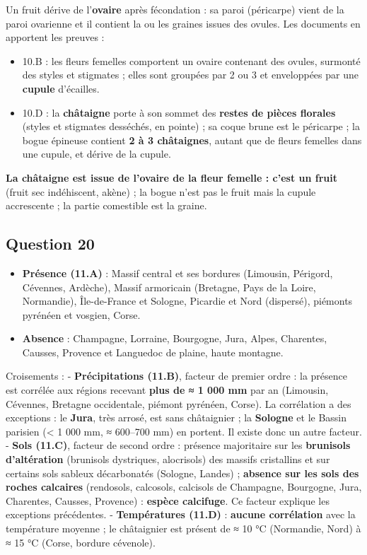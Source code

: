 \documentclass[11pt,a4paper]{article}
\providecommand{\tightlist}{\setlength{\itemsep}{0pt}\setlength{\parskip}{0pt}}
\begin{document}
Un fruit dérive de l'\textbf{ovaire} après fécondation : sa paroi (péricarpe) vient de la paroi ovarienne et il contient la ou les graines issues des ovules. Les documents en apportent les preuves :

\begin{itemize}
\tightlist
\item
  10.B : les fleurs femelles comportent un ovaire contenant des ovules, surmonté des styles et stigmates ; elles sont groupées par 2 ou 3 et enveloppées par une \textbf{cupule} d'écailles.
\item
  10.D : la \textbf{châtaigne} porte à son sommet des \textbf{restes de pièces florales} (styles et stigmates desséchés, en pointe) ; sa coque brune est le péricarpe ; la bogue épineuse contient \textbf{2 à 3 châtaignes}, autant que de fleurs femelles dans une cupule, et dérive de la cupule.
\end{itemize}

\textbf{La châtaigne est issue de l'ovaire de la fleur femelle : c'est un fruit} (fruit sec indéhiscent, akène) ; la bogue n'est pas le fruit mais la cupule accrescente ; la partie comestible est la graine.

\hypertarget{question-20}{%
\subsection{Question 20}\label{question-20}}

\begin{itemize}
\tightlist
\item
  \textbf{Présence (11.A)} : Massif central et ses bordures (Limousin, Périgord, Cévennes, Ardèche), Massif armoricain (Bretagne, Pays de la Loire, Normandie), Île-de-France et Sologne, Picardie et Nord (dispersé), piémonts pyrénéen et vosgien, Corse.
\item
  \textbf{Absence} : Champagne, Lorraine, Bourgogne, Jura, Alpes, Charentes, Causses, Provence et Languedoc de plaine, haute montagne.
\end{itemize}

Croisements :
- \textbf{Précipitations (11.B)}, facteur de premier ordre : la présence est corrélée aux régions recevant \textbf{plus de ≈ 1 000 mm} par an (Limousin, Cévennes, Bretagne occidentale, piémont pyrénéen, Corse). La corrélation a des exceptions : le \textbf{Jura}, très arrosé, est sans châtaignier ; la \textbf{Sologne} et le Bassin parisien (\textless{} 1 000 mm, ≈ 600--700 mm) en portent. Il existe donc un autre facteur.
- \textbf{Sols (11.C)}, facteur de second ordre : présence majoritaire sur les \textbf{brunisols d'altération} (brunisols dystriques, alocrisols) des massifs cristallins et sur certains sols sableux décarbonatés (Sologne, Landes) ; \textbf{absence sur les sols des roches calcaires} (rendosols, calcosols, calcisols de Champagne, Bourgogne, Jura, Charentes, Causses, Provence) : \textbf{espèce calcifuge}. Ce facteur explique les exceptions précédentes.
- \textbf{Températures (11.D)} : \textbf{aucune corrélation} avec la température moyenne ; le châtaignier est présent de ≈ 10 °C (Normandie, Nord) à ≈ 15 °C (Corse, bordure cévenole).
\end{document}
